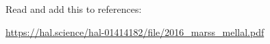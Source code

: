 \documentclass{asme2ej}
\begin{document}
Read and add this to references:

\url{https://hal.science/hal-01414182/file/2016_marss_mellal.pdf}


%




\end{document}
